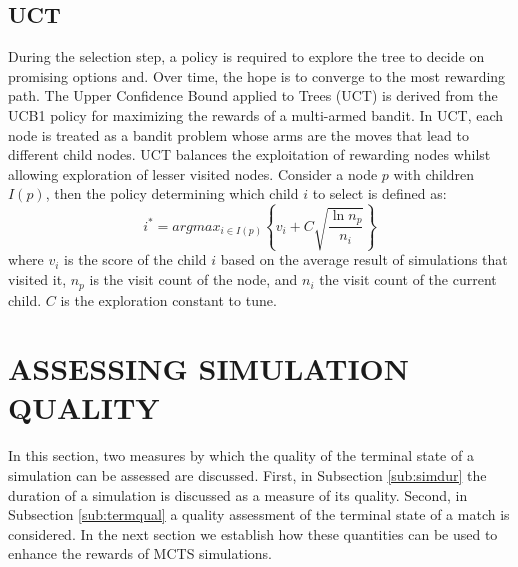 \documentclass{ecai2014}
\begin{document}
\subsection{UCT}
\label{subsec:uct}
During the selection step, a policy is required to explore the tree to decide on promising options and. Over time, the hope is to converge to the most rewarding path. The Upper Confidence Bound applied to Trees (UCT) \cite{kocsis2006bandit} is derived from the UCB1 policy \cite{auer2002using} for maximizing the rewards of a multi-armed bandit. In UCT, each node is treated as a bandit problem whose arms are the moves that lead to different child nodes. UCT balances the exploitation of rewarding nodes whilst allowing exploration of lesser visited nodes. Consider a node $p$ with children $I(p)$, then the policy determining which child $i$ to select is defined as:
\begin{equation}
\label{eq:uct}
i^* = argmax_{i \in I(p)}\left\{ v_i + C \sqrt{ \frac{\ln{n_p}}{n_i}}\right\}
\end{equation}
where $v_i$ is the score of the child $i$ based on the average result of simulations that visited it, $n_p$ is the visit count of the node, and $n_i$ the visit count of the current child. $C$ is the exploration constant to tune. 

\section{ASSESSING SIMULATION QUALITY}
\label{sec:poqual}
In this section, two measures by which the quality of the terminal state of a simulation can be assessed are discussed. First, in Subsection \ref{sub:simdur} the duration of a simulation is discussed as a measure of its quality. Second, in Subsection \ref{sub:termqual} a quality assessment of the terminal state of a match is considered. In the next section we establish how these quantities can be used to enhance the rewards of MCTS simulations.
\end{document}
